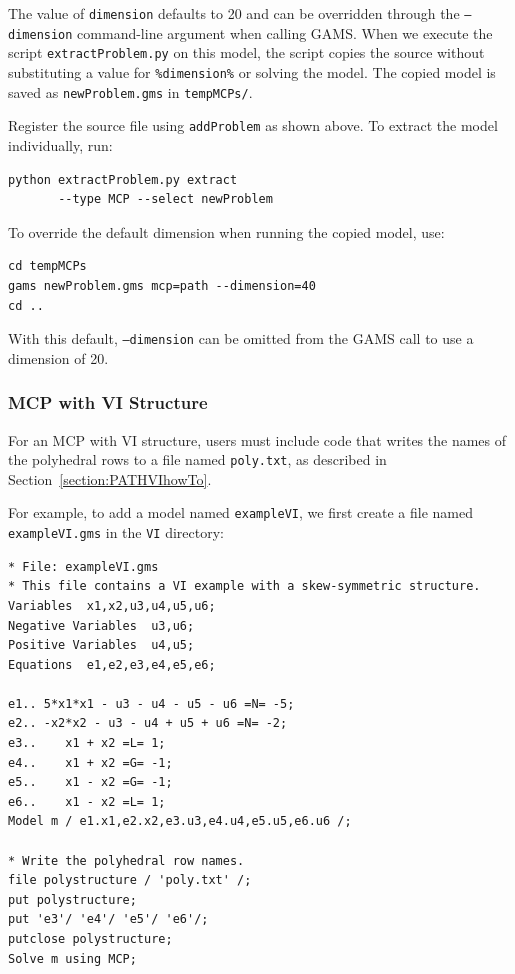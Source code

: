 The value of \texttt{dimension} defaults to 20 and can be overridden through the \texttt{--dimension} command-line argument when calling GAMS. When we execute the script \texttt{extractProblem.py} on this model, the script copies the source without substituting a value for \texttt{\%dimension\%} or solving the model. The copied model is saved as \texttt{newProblem.gms} in \texttt{tempMCPs/}.

Register the source file using \texttt{addProblem} as shown above. To extract the model individually, run:

\begin{verbatim}
python extractProblem.py extract 
       --type MCP --select newProblem
\end{verbatim}

To override the default dimension when running the copied model, use:

\begin{verbatim}
cd tempMCPs
gams newProblem.gms mcp=path --dimension=40
cd ..
\end{verbatim}

With this default, \texttt{--dimension} can be omitted from the GAMS call to use a dimension of 20.

\subsubsection{MCP with VI Structure}

For an MCP with VI structure, users must include code that writes the names of the polyhedral rows to a file named \texttt{poly.txt}, as described in Section~\ref{section:PATHVIhowTo}.

For example, to add a model named \texttt{exampleVI}, we first create a file named \texttt{exampleVI.gms} in the \texttt{VI} directory:

\begin{verbatim}
* File: exampleVI.gms
* This file contains a VI example with a skew-symmetric structure.
Variables  x1,x2,u3,u4,u5,u6;
Negative Variables  u3,u6;
Positive Variables  u4,u5;
Equations  e1,e2,e3,e4,e5,e6;

e1.. 5*x1*x1 - u3 - u4 - u5 - u6 =N= -5;
e2.. -x2*x2 - u3 - u4 + u5 + u6 =N= -2;
e3..    x1 + x2 =L= 1;
e4..    x1 + x2 =G= -1;
e5..    x1 - x2 =G= -1;
e6..    x1 - x2 =L= 1;
Model m / e1.x1,e2.x2,e3.u3,e4.u4,e5.u5,e6.u6 /;

* Write the polyhedral row names.
file polystructure / 'poly.txt' /;
put polystructure;
put 'e3'/ 'e4'/ 'e5'/ 'e6'/;
putclose polystructure;
Solve m using MCP;
\end{verbatim}

